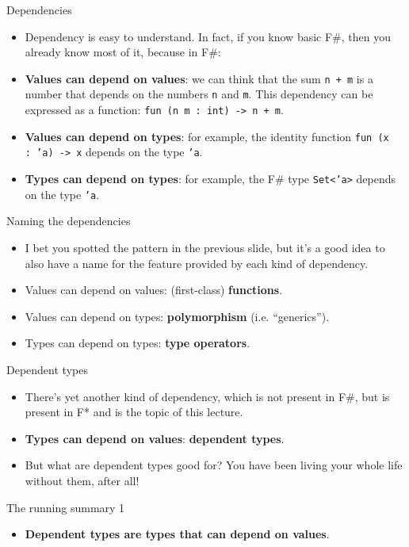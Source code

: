 \documentclass{beamer}
\newcommand{\m}[1]{\texttt{#1}}
\begin{document}
\begin{frame}{Dependencies}
\begin{itemize}
	\item Dependency is easy to understand. In fact, if you know basic F\#, then you already know most of it, because in F\#:
	\item \textbf{Values can depend on values}: we can think that the sum \m{n + m} is a number that depends on the numbers \m{n} and \m{m}. This dependency can be expressed as a function: \m{fun (n m :\ int) -> n + m}.
	\item \textbf{Values can depend on types}: for example, the identity function \m{fun (x :\ 'a) -> x} depends on the type \m{'a}.
	\item \textbf{Types can depend on types}: for example, the F\# type \m{Set<'a>} depends on the type \m{'a}.
\end{itemize}
\end{frame}

\begin{frame}{Naming the dependencies}
\begin{itemize}
	\item I bet you spotted the pattern in the previous slide, but it's a good idea to also have a name for the feature provided by each kind of dependency.
	\item Values can depend on values: (first-class) \textbf{functions}.
	\item Values can depend on types: \textbf{polymorphism} (i.e. ``generics'').
	\item Types can depend on types: \textbf{type operators}.
\end{itemize}
\end{frame}

\begin{frame}{Dependent types}
\begin{itemize}
	\item There's yet another kind of dependency, which is not present in F\#, but is present in F* and is the topic of this lecture.
	\item \textbf{Types can depend on values}: \textbf{dependent types}.
	\item But what are dependent types good for? You have been living your whole life without them, after all!
\end{itemize}
\end{frame}

\begin{frame}{The running summary 1}
\begin{itemize}
	\item \textbf{Dependent types are types that can depend on values}.
\end{itemize}
\end{frame}
\end{document}
